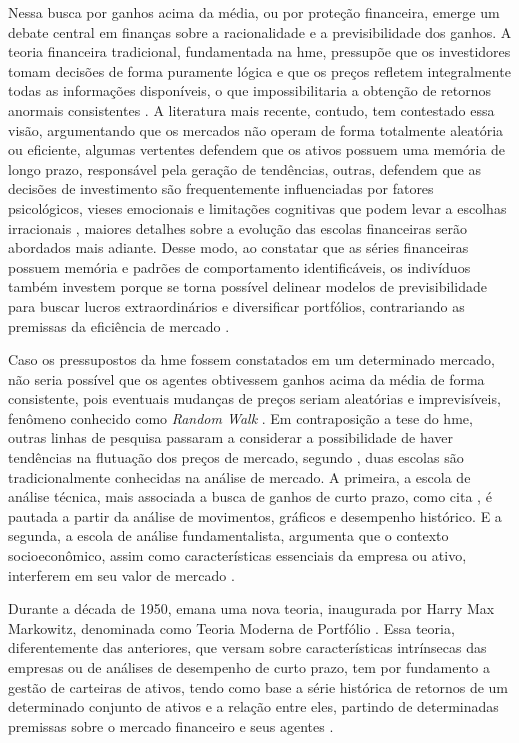 Nessa busca por ganhos acima da média, ou por proteção financeira, emerge um debate central em finanças sobre a racionalidade e a previsibilidade dos ganhos. A teoria financeira tradicional, fundamentada na \ac{hme}, pressupõe que os investidores tomam decisões de forma puramente lógica e que os preços refletem integralmente todas as informações disponíveis, o que impossibilitaria a obtenção de retornos anormais consistentes \cite{sutiene2024enhancing}. A literatura mais recente, contudo, tem contestado essa visão, argumentando que os mercados não operam de forma totalmente aleatória ou eficiente, algumas vertentes defendem que os ativos possuem uma memória de longo prazo, responsável pela geração de tendências, outras, defendem que as decisões de investimento são frequentemente influenciadas por fatores psicológicos, vieses emocionais e limitações cognitivas que podem levar a escolhas irracionais \cite{charfeddine2020investigating,almansour2023behavioral,sutiene2024enhancing}, maiores detalhes sobre a evolução das escolas financeiras serão abordados mais adiante. Desse modo, ao constatar que as séries financeiras possuem memória e padrões de comportamento identificáveis, os indivíduos também investem porque se torna possível delinear modelos de previsibilidade para buscar lucros extraordinários e diversificar portfólios, contrariando as premissas da eficiência de mercado \cite{charfeddine2020investigating}.

Caso os pressupostos da \acs{hme} fossem constatados em um determinado mercado, não seria possível que os agentes obtivessem ganhos acima da média de forma consistente, pois eventuais mudanças de preços seriam aleatórias e imprevisíveis, fenômeno conhecido como \textit{Random Walk} \cite{livieris2020ensemble,ferreira2021artificial}. Em contraposição a tese do \acs{hme}, outras linhas de pesquisa passaram a considerar a possibilidade de haver tendências na flutuação dos preços de mercado, segundo , duas escolas são tradicionalmente conhecidas na análise de mercado. A primeira, a escola de análise técnica, mais associada a busca de ganhos de curto prazo, como cita , é pautada a partir da análise de movimentos, gráficos e desempenho histórico. E a segunda, a escola de análise fundamentalista, argumenta que o contexto socioeconômico, assim como características essenciais da empresa ou ativo, interferem em seu valor de mercado \cite{ferreira2021artificial}.  

Durante a década de 1950, emana uma nova teoria, inaugurada por Harry Max Markowitz, denominada como Teoria Moderna de Portfólio \cite{markowitz1952portfolio}. Essa teoria, diferentemente das anteriores, que versam sobre características intrínsecas das empresas ou de análises de desempenho de curto prazo, tem por fundamento a gestão de carteiras de ativos, tendo como base a série histórica de retornos de um determinado conjunto de ativos e a relação entre eles, partindo de determinadas premissas sobre o mercado financeiro e seus agentes \cite{chaweewanchon2022markowitz}.

